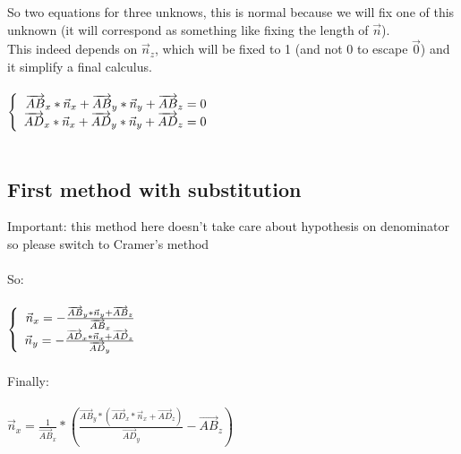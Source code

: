 \documentclass{article}
\begin{document}
		So two equations for three unknows, this is normal because we will fix one of this unknown (it will correspond as something like fixing the length of $\vec{n}$).\\
		This indeed depends on $\vec{n}_z$, which will be fixed to 1 (and not 0 to escape $\vec{0}$) and it simplify a final calculus.\\\\
		
		$\left\{\begin{array}{r c l}
			\overrightarrow{AB}_x * \vec{n}_x + \overrightarrow{AB}_y * \vec{n}_y + \overrightarrow{AB}_z = 0\\
			\overrightarrow{AD}_x * \vec{n}_x + \overrightarrow{AD}_y * \vec{n}_y + \overrightarrow{AD}_z = 0
		\end{array}\right.$\\\\
		
		\subsection{First method with substitution}
		
			\textcolor[rgb]{1,0,0}{Important: this method here doesn't take care about hypothesis on denominator so please switch to Cramer's method}\\\\
		
			So:\\\\
			
			$\left\{\begin{array}{r c l}
				\vec{n}_x = - \frac{\overrightarrow{AB}_y * \vec{n}_y + \overrightarrow{AB}_z}{\overrightarrow{AB}_x}\\
				\vec{n}_y = - \frac{\overrightarrow{AD}_x * \vec{n}_x + \overrightarrow{AD}_z}{\overrightarrow{AD}_y}
			\end{array}\right.$\\\\
			
			Finally:\\\\
			
			$\vec{n}_x = \frac{1}{\overrightarrow{AB}_x} * \left(\frac{\overrightarrow{AB}_y * (\overrightarrow{AD}_x * \vec{n}_x + \overrightarrow{AD}_z)}{\overrightarrow{AD}_y} - \overrightarrow{AB}_z\right)$\\\\
			
\end{document}
